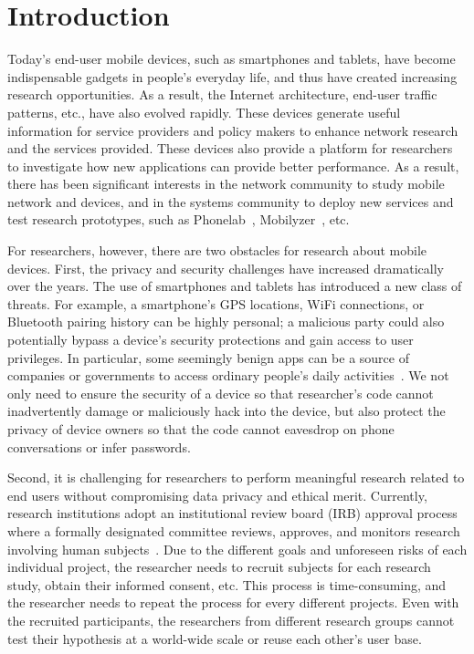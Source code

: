 \section{Introduction}

Today's end-user mobile devices, such as smartphones and
tablets, have become indispensable gadgets in people's everyday
life, and thus have created increasing research opportunities.
As a result, the Internet architecture, end-user traffic
patterns, etc., have also evolved rapidly. These devices
generate useful information for service providers and policy
makers to enhance network research and the services provided.
These devices also provide a platform for researchers to
investigate how new applications can provide better performance.
As a result, there has been significant interests in the network
community to study mobile network and devices, and in the
systems community to deploy new services and test research
prototypes, such as Phonelab~\cite{nandugudi2013phonelab}, 
Mobilyzer~\cite{nikravesh2015mobilyzer}, etc.
					
For researchers, however, there are two obstacles for research
about mobile devices. First, the privacy and security challenges
have increased dramatically over the years. The use of 
smartphones and tablets has introduced a new class of threats. 
For example, a smartphone's GPS locations,
WiFi connections, or Bluetooth pairing history can be highly
personal; a malicious party could also potentially bypass a
device's security protections and gain access to user
privileges. In particular, some seemingly benign apps can be a 
source of companies or governments to access ordinary 
people's daily activities~\cite{AngryBirds}. 
We not only need to ensure the security of a device
so that researcher's code cannot inadvertently damage or
maliciously hack into the device, but also protect the privacy
of device owners so that the code cannot eavesdrop on phone
conversations or infer passwords.

Second, it is challenging for researchers to perform meaningful
research related to end users without compromising data privacy
and ethical merit. Currently, research institutions adopt an
institutional review board (IRB) approval process where a
formally designated committee reviews, approves, and monitors
research involving human subjects~\cite{irb}.
Due to the different goals and unforeseen risks of each
individual project, the researcher needs to recruit subjects for
each research study, obtain their informed consent, etc. This
process is time-consuming, and the researcher needs to repeat
the process for every different projects. Even with the
recruited participants, the researchers from different research
groups cannot test their hypothesis at a world-wide scale or
reuse each other's user base.
					

